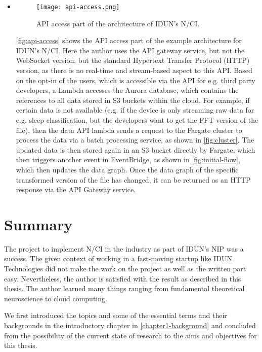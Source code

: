 \begin{itemize}
  \item \begin{figure}[!ht]
          \centering
          \hspace*{0.4in}
          \texttt{[image: api-access.png]}
          \caption{API access part of the architecture of IDUN's N/CI.}
          \label{fig:api-access}
        \end{figure}

        \autoref{fig:api-access} shows the API access part of the example architecture for IDUN's N/CI. Here the author uses the API gateway service, but not the WebSocket version, but the standard Hypertext Transfer Protocol (HTTP) version, as there is no real-time and stream-based aspect to this API. Based on the opt-in of the users, which is accessible via the API for e.g. third party developers, a Lambda accesses the Aurora database, which contains the references to all data stored in S3 buckets within the cloud. For example, if certain data is not available (e.g. if the device is only streaming raw data for e.g. sleep classification, but the developers want to get the FFT version of the file), then the data API lambda sends a request to the Fargate cluster to process the data via a batch processing service, as shown in \autoref{fig:cluster}. The updated data is then stored again in an S3 bucket directly by Fargate, which then triggers another event in EventBridge, as shown in \autoref{fig:initial-flow}, which then updates the data graph. Once the data graph of the specific transformed version of the file has changed, it can be returned as an HTTP response via the API Gateway service.

\end{itemize}

\section{Summary}
\label{chapter5-summary}

The project to implement N/CI in the industry as part of IDUN's NIP was a success. The given context of working in a fast-moving startup like IDUN Technologies did not make the work on the project as well as the written part easy. Nevertheless, the author is satisfied with the result as described in this thesis. The author learned many things ranging from fundamental theoretical neuroscience to cloud computing.

We first introduced the topics and some of the essential terms and their backgrounds in the introductory chapter in \autoref{chapter1-background} and concluded from the possibility of the current state of research to the aims and objectives for this thesis.

